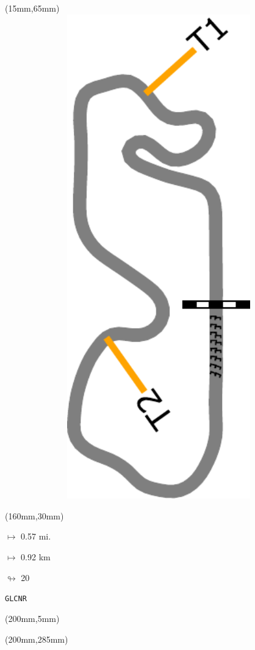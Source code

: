 \begin{textblock*}{185mm}(15mm,65mm)%
\centering
\mbox{\includegraphics[width=185mm,height=210mm,keepaspectratio]{PT/GLCNR.pdf}}
\end{textblock*}
\begin{textblock*}{40mm}(160mm,30mm)%
\Large
\par$\mapsto$ 0.57 mi.
\par$\mapsto$ 0.92 km
\par$\looparrowright$ 20
\par\hfill\tiny\tt GLCNR\\
\end{textblock*}
\begin{textblock*}{20mm}(200mm,5mm)%
\fbox{\thepage}
\label{GLCNR}
\end{textblock*}
\begin{textblock*}{20mm}(200mm,285mm)%
\fbox{\thepage}
\end{textblock*}

